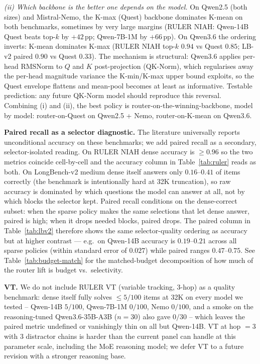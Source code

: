 \documentclass[11pt]{article}
\theoremstyle{remark}
\begin{document}
\emph{(ii) Which backbone is the better one depends on the model.} On Qwen2.5 (both sizes) and Mistral-Nemo, the K-max (Quest) backbone dominates K-mean on both benchmarks, sometimes by very large margins (RULER NIAH: Qwen-14B Quest beats top-$k$ by $+42$\,pp; Qwen-7B-1M by $+66$\,pp). On Qwen3.6 the ordering inverts: K-mean dominates K-max (RULER NIAH top-$k$ $0.94$ vs Quest $0.85$; LB-v2 paired $0.90$ vs Quest $0.33$). The mechanism is structural: Qwen3.6 applies per-head RMSNorm to $Q$ and $K$ post-projection (QK-Norm), which regularises away the per-head magnitude variance the K-min/K-max upper bound exploits, so the Quest envelope flattens and mean-pool becomes at least as informative. Testable prediction: any future QK-Norm model should reproduce this reversal. Combining (i) and (ii), the best policy is router-on-the-winning-backbone, model by model: router-on-Quest on Qwen2.5 + Nemo, router-on-K-mean on Qwen3.6.

\textbf{Paired recall as a selector diagnostic.} The literature universally reports unconditional accuracy on these benchmarks; we add paired recall as a secondary, selector-isolated reading. On RULER NIAH dense accuracy is $\geq 0.96$ so the two metrics coincide cell-by-cell and the accuracy column in Table~\ref{tab:ruler} reads as both. On LongBench-v2 medium dense itself answers only $0.16$--$0.41$ of items correctly (the benchmark is intentionally hard at 32K truncation), so raw accuracy is dominated by which questions the model can answer at all, not by which blocks the selector kept. Paired recall conditions on the dense-correct subset: when the sparse policy makes the same selections that let dense answer, paired is high; when it drops needed blocks, paired drops. The paired column in Table~\ref{tab:lbv2} therefore shows the same selector-quality ordering as accuracy but at higher contrast — e.g.\ on Qwen-14B accuracy is $0.19$--$0.21$ across all sparse policies (within standard error of $0.027$) while paired ranges $0.47$--$0.75$. See Table~\ref{tab:budget-match} for the matched-budget decomposition of how much of the router lift is budget vs.\ selectivity.

\textbf{VT.} We do not include RULER VT (variable tracking, 3-hop) as a quality benchmark: dense itself fully solves $\le 5/100$ items at 32K on every model we tested -- Qwen-14B $5/100$, Qwen-7B-1M $0/100$, Nemo $0/100$, and a smoke on the reasoning-tuned Qwen3.6-35B-A3B ($n=30$) also gave $0/30$ -- which leaves the paired metric undefined or vanishingly thin on all but Qwen-14B. VT at hop $=3$ with $3$ distractor chains is harder than the current panel can handle at this parameter scale, including the MoE reasoning model; we defer VT to a future revision with a stronger reasoning base.
\end{document}
